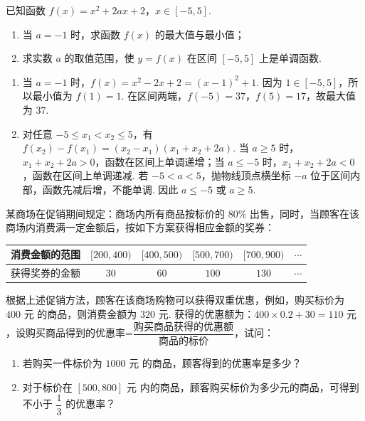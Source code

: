 \begin{problem}
已知函数 \(f(x)=x^2 + 2ax + 2\)，\(x \in [-5, 5]\).

\begin{enumerate}
\item 当 \(a=-1\) 时，求函数 \(f(x)\) 的最大值与最小值；
\item 求实数 \(a\) 的取值范围，使 \(y = f(x)\) 在区间 \([-5, 5]\) 上是单调函数.
\end{enumerate}
\end{problem}

\begin{solution}
\begin{enumerate}
\item 当 \(a=-1\) 时，\(f(x)=x^2-2x+2=(x-1)^2+1\). 因为 \(1\in[-5,5]\)，所以最小值为 \(f(1)=1\). 在区间两端，\(f(-5)=37\)，\(f(5)=17\)，故最大值为 \(37\).
\item 对任意 \(-5\leqslant x_1<x_2\leqslant5\)，有 \(f(x_2)-f(x_1)=(x_2-x_1)(x_1+x_2+2a)\). 当 \(a\geqslant5\) 时，\(x_1+x_2+2a>0\)，函数在区间上单调递增；当 \(a\leqslant-5\) 时，\(x_1+x_2+2a<0\)，函数在区间上单调递减. 若 \(-5<a<5\)，抛物线顶点横坐标 \(-a\) 位于区间内部，函数先减后增，不能单调. 因此 \(a\leqslant-5\) 或 \(a\geqslant5\).
\end{enumerate}
\end{solution}

\begin{problem}
某商场在促销期间规定：商场内所有商品按标价的 \(80\%\) 出售，同时，当顾客在该商场内消费满一定金额后，按如下方案获得相应金额的奖券：

\begin{center}
\begin{tabular}{|c|c|c|c|c|c|}
\hline
消费金额的范围 & \([200,400)\) & \([400,500)\) & \([500,700)\) & \([700,900)\) & \(\cdots\) \\
\hline
获得奖券的金额 & \(30\) & \(60\) & \(100\) & \(130\) & \(\cdots\) \\
\hline
\end{tabular}
\end{center}

根据上述促销方法，顾客在该商场购物可以获得双重优惠，例如，购买标价为 \(400\text{ 元}\) 的商品，则消费金额为 \(320\text{ 元}\). 获得的优惠额为：\(400 \times 0.2 + 30 = 110\text{ 元}\)，设购买商品得到的优惠率=\(\dfrac{\text{购买商品获得的优惠额}}{\text{商品的标价}}\)，试问：

\begin{enumerate}
\item 若购买一件标价为 \(1000\text{ 元}\) 的商品，顾客得到的优惠率是多少？
\item 对于标价在 \([500,800]\text{ 元}\) 内的商品，顾客购买标价为多少\(\text{元}\)的商品，可得到不小于 \(\dfrac{1}{3}\) 的优惠率？
\end{enumerate}
\end{problem}

